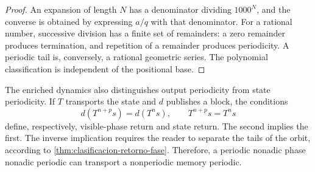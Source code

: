 \begin{proof}
An expansion of length \(N\) has a denominator dividing \(1000^N\), and
the converse is obtained by expressing \(a/q\) with that denominator. For a
rational number, successive division has a finite set of remainders: a zero
remainder produces termination, and repetition of a remainder produces periodicity.
A periodic tail is, conversely, a rational geometric series. The
polynomial classification is independent of the positional base.
\end{proof}

The enriched dynamics also distinguishes output periodicity from
state periodicity. If \(T\) transports the state and \(d\) publishes a
block, the conditions
\[
 d(T^{n+p}s)=d(T^n s),
 \qquad
 T^{n+p}s=T^n s
\]
define, respectively, visible-phase return and state return. The second
implies the first. The inverse implication requires the reader to separate the
tails of the orbit, according to
\cref{thm:clasificacion-retorno-fase}. Therefore, a periodic nonadic phase nonadic periodic
can transport a nonperiodic memory periodic.

